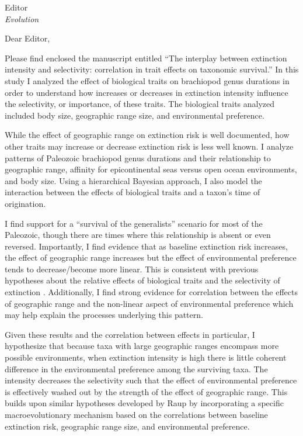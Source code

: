 \documentclass{letter}
\begin{document}
\begin{letter}{Editor \\ \textit{Evolution}}
  \opening{Dear Editor,}

  Please find enclosed the manuscript entitled ``The interplay between extinction intensity and selectivity: correlation in trait effects on taxonomic survival.'' In this study I analyzed the effect of biological traits on brachiopod genus durations in order to understand how increases or decreases in extinction intensity influence the selectivity, or importance, of these traits. The biological traits analyzed included body size, geographic range size, and environmental preference.
  
  While the effect of geographic range on extinction risk is well documented, how other traits may increase or decrease extinction risk is less well known. I analyze patterns of Paleozoic brachiopod genus durations and their relationship to geographic range, affinity for epicontinental seas versus open ocean environments, and body size. Using a hierarchical Bayesian approach, I also model the interaction between the effects of biological traits and a taxon's time of origination. 

  I find support for a ``survival of the generalists'' scenario for most of the Paleozoic, though there are times where this relationship is absent or even reversed. Importantly, I find evidence that as baseline extinction risk increases, the effect of geographic range increases but the effect of environmental preference tends to decrease/become more linear. This is consistent with previous hypotheses about the relative effects of biological traits and the selectivity of extinction \cite{Jablonski1987,Raup1991b}. Additionally, I find strong evidence for correlation between the effects of geographic range and the non-linear aspect of environmental preference which may help explain the processes underlying this pattern. 
  
  Given these results and the correlation between effects in particular, I hypothesize that because taxa with large geographic ranges encompass more possible environments, when extinction intensity is high there is little coherent difference in the environmental preference among the surviving taxa. The intensity decreases the selectivity such that the effect of environmental preference is effectively washed out by the strength of the effect of geographic range. This builds upon similar hypotheses developed by Raup \cite{Raup1991b,Raup1994} by incorporating a specific macroevolutionary mechanism based on the correlations between baseline extinction risk, geographic range size, and environmental preference.
  

\end{letter}
\end{document}
